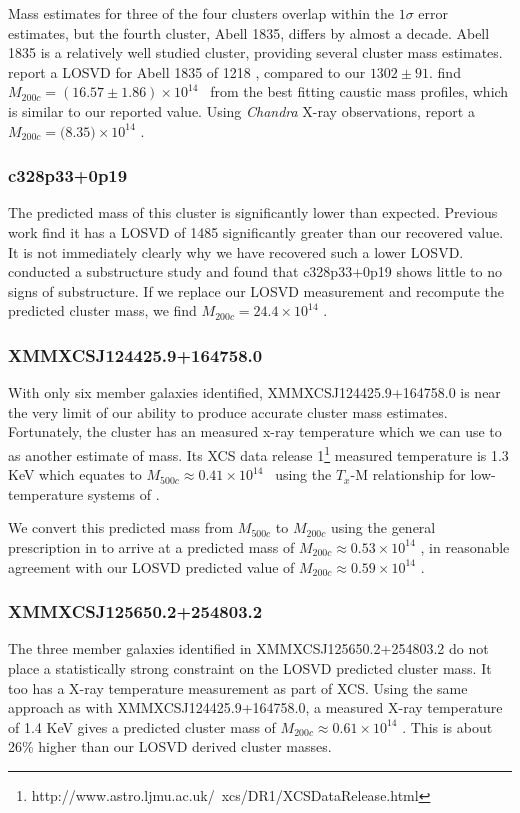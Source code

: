 Mass estimates for three of the four clusters overlap within the $1\sigma$ error estimates, but the fourth cluster, Abell 1835, differs by almost a decade. Abell 1835 is a relatively well studied cluster, providing several cluster mass estimates. \cite{Hoekstra2012} report a LOSVD for Abell 1835 of 1218 \kms, compared to our $1302\pm91 $\kms. \cite{Geller2013} find $M_{200c} = (16.57\pm1.86)\times 10^{14}$ \Msol\ from the best fitting caustic mass profiles, which is similar to our reported value. Using \emph{Chandra} X-ray observations, \cite{Bonamente2012} report a $M_{200c} = (8.35$$)\times 10^{14}$ \Msol.

\subsubsection{c328p33+0p19}
The predicted mass of this cluster is significantly lower than expected. Previous work \citep{Wing2013} find it has a LOSVD of 1485 \kms significantly greater than our recovered value. It is not immediately clearly why we have recovered such a lower LOSVD. \cite{Wing2013} conducted a substructure study and found that c328p33+0p19 shows little to no signs of substructure. If we replace our LOSVD measurement and recompute the predicted cluster mass, we find $M_{200c} = 24.4\times10^{14}$ \Msol. 

\subsubsection{XMMXCSJ124425.9+164758.0}
With only six member galaxies identified, XMMXCSJ124425.9+164758.0 is near the very limit of our ability to produce accurate cluster mass estimates. Fortunately, the cluster has an measured x-ray temperature which we can use to as another estimate of mass. Its XCS data release 1\footnote{http://www.astro.ljmu.ac.uk/~xcs/DR1/XCSDataRelease.html} \citep{Mehrtens2012} measured temperature is 1.3 KeV which equates to $M_{500c}\approx0.41\times10^{14}$ \Msol\ using the $T_x$-M relationship for low-temperature systems of \cite{Finoguenov2001}.

We convert this predicted mass from $M_{500c}$ to $M_{200c}$ using the general prescription in \cite{Hu2003} to arrive at a predicted mass of $M_{200c} \approx 0.53\times10^{14}$ \Msol, in reasonable agreement with our LOSVD predicted value of $M_{200c} \approx 0.59\times10^{14}$ \Msol.

\subsubsection{XMMXCSJ125650.2+254803.2}
The three member galaxies identified in XMMXCSJ125650.2+254803.2 do not place a statistically strong constraint on the LOSVD predicted cluster mass. It too has a X-ray temperature measurement as part of XCS. Using the same approach as with XMMXCSJ124425.9+164758.0, a measured X-ray temperature of 1.4 KeV gives a predicted cluster mass of $M_{200c} \approx 0.61\times10^{14}$ \Msol. This is about 26\% higher than our LOSVD derived cluster masses. 



